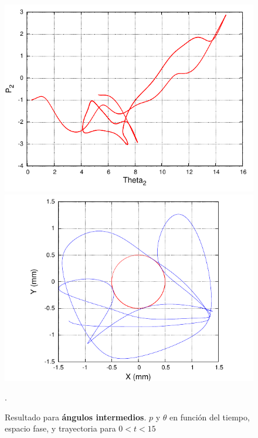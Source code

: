 \documentclass[10pt,letterpaper]{article}
\begin{document}
\begin{figure}
\includegraphics[scale=0.9]{MGrafica_EspacioFase.pdf}
\includegraphics[scale=0.9]{MGrafica_Trayectoria.pdf}
\caption{Resultado para \textbf{ángulos intermedios}. $p$ y $\theta$ en función del tiempo, espacio fase, y trayectoria para $0<t<15$}\label{Fig-AngulosInter}.
\end{figure}
\end{document}
